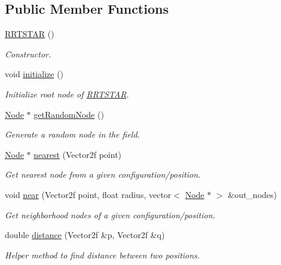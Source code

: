 \subsection*{Public Member Functions}
\begin{DoxyCompactItemize}
\item 
\hyperlink{classRRTSTAR_ad9c4671d299e90158b61621959ac646f}{R\+R\+T\+S\+T\+AR} ()
\begin{DoxyCompactList}\small\item\em Constructor. \end{DoxyCompactList}\item 
void \hyperlink{classRRTSTAR_aba683c9684e61576e5833b2293a0c589}{initialize} ()
\begin{DoxyCompactList}\small\item\em Initialize root node of \hyperlink{classRRTSTAR}{R\+R\+T\+S\+T\+AR}. \end{DoxyCompactList}\item 
\hyperlink{structNode}{Node} $\ast$ \hyperlink{classRRTSTAR_a52b217b8070afabc733451923e482c55}{get\+Random\+Node} ()
\begin{DoxyCompactList}\small\item\em Generate a random node in the field. \end{DoxyCompactList}\item 
\hyperlink{structNode}{Node} $\ast$ \hyperlink{classRRTSTAR_a17b8392462e01ed383e7ba01d9ff7917}{nearest} (Vector2f point)
\begin{DoxyCompactList}\small\item\em Get nearest node from a given configuration/position. \end{DoxyCompactList}\item 
void \hyperlink{classRRTSTAR_a206d008a7e35e8da67ba45e69dda614e}{near} (Vector2f point, float radius, vector$<$ \hyperlink{structNode}{Node} $\ast$ $>$ \&out\+\_\+nodes)
\begin{DoxyCompactList}\small\item\em Get neighborhood nodes of a given configuration/position. \end{DoxyCompactList}\item 
double \hyperlink{classRRTSTAR_a6b25100958bc2983c8e884e06a1781fd}{distance} (Vector2f \&p, Vector2f \&q)
\begin{DoxyCompactList}\small\item\em Helper method to find distance between two positions. \end{DoxyCompactList}\item 

\end{DoxyCompactItemize}
